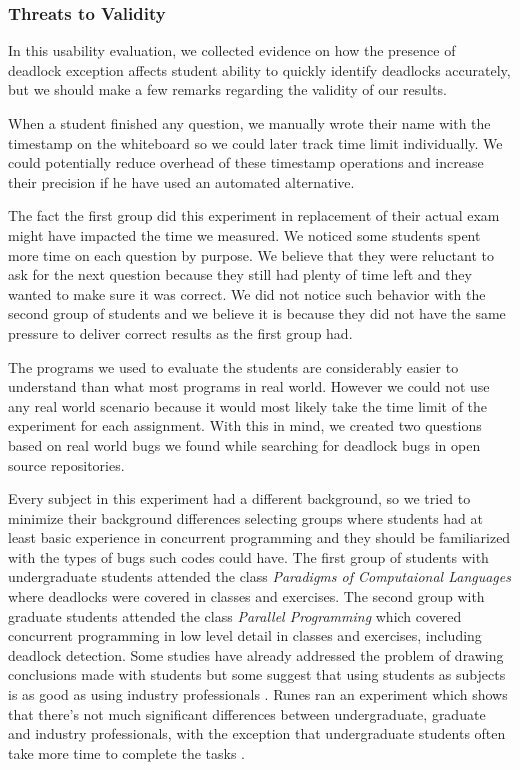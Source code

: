 \subsubsection{Threats to Validity}

In this usability evaluation, we collected evidence on how the presence of deadlock exception affects student ability to quickly identify deadlocks accurately, but we should make a few remarks regarding the validity of our results.

When a student finished any question, we manually wrote their name with the timestamp on the whiteboard so we could later track time limit individually. We could potentially reduce overhead of these timestamp operations and increase their precision if he have used an automated alternative.

The fact the first group did this experiment in replacement of their actual exam might have impacted the time we measured. We noticed some students spent more time on each question by purpose. We believe that they were reluctant to ask for the next question because they still had plenty of time left and they wanted to make sure it was correct. We did not notice such behavior with the second group of students and we believe it is because they did not have the same pressure to deliver correct results as the first group had.

The programs we used to evaluate the students are considerably easier to understand than what most programs in real world. However we could not use any real world scenario because it would most likely take the time limit of the experiment for each assignment. With this in mind, we created two questions based on real world bugs we found while searching for deadlock bugs in open source repositories.

Every subject in this experiment had a different background, so we tried to minimize their background differences selecting groups where students had at least basic experience in concurrent programming and they should be familiarized with the types of bugs such codes could have. The first group of students with undergraduate students attended the class \emph{Paradigms of Computaional Languages} where deadlocks were covered in classes and exercises. The second group with graduate students attended the class \emph{Parallel Programming} which covered concurrent programming in low level detail in classes and exercises, including deadlock detection. Some studies have already addressed the problem of drawing conclusions made with students but some suggest that using students as subjects is as good as using industry professionals \cite{staron}. Runes ran an experiment which shows that there's not much significant differences between undergraduate, graduate and industry professionals, with the exception that undergraduate students often take more time to complete the tasks \cite{runes}.

